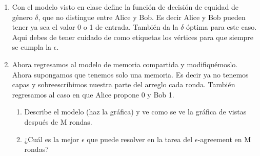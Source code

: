\documentclass{article}
\begin{document}
\begin{enumerate}
\item{
    Con el modelo visto en clase define la función de decisión de equidad de género
    $\delta$, que no distingue entre Alice y Bob. Es decir Alice y Bob pueden tener
    ya sea el valor 0 o 1 de entrada. También da la $\delta$ óptima para este caso.
    Aqui debes de tener cuidado de como etiquetas los vértices para que siempre
    se cumpla la $\epsilon$.
  }

\item{
    
    Ahora regresamos al modelo de memoria compartida y modifiquémoslo. Ahora 
    supongamos que tenemos solo una memoria. Es decir ya no tenemos capas y
    sobreescribimos nuestra parte del arreglo cada ronda. También regresamos
    al caso en que Alice propone 0 y Bob 1.
    \begin{enumerate}
      
    \item{Describe el modelo (haz la gráfica) y ve como se ve la gráfica de 
        vistas después de M rondas.
      }

    \item{¿Cuál es la mejor $\epsilon$ que puede resolver en la tarea del 
        $\epsilon$-agreement en M rondas?}
    \end{enumerate}
  }

\end{enumerate}
\end{document}
